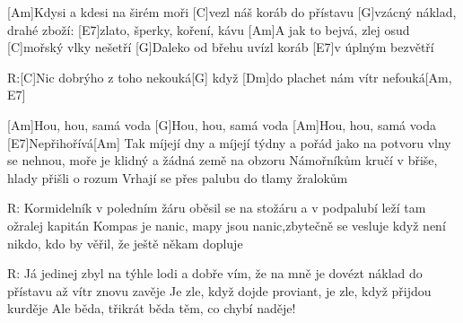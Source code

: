 
[Am]Kdysi a kdesi na širém moři [C]vezl náš koráb do přístavu 
[G]vzácný náklad, drahé zboží: [E7]zlato, šperky, koření, kávu 
[Am]A jak to bejvá, zlej osud [C]mořský vlky nešetří 
[G]Daleko od břehu uvízl koráb [E7]v úplným bezvětří 

R:[C]Nic dobrýho z toho nekouká[G] 
když [Dm]do plachet nám vítr nefouká[Am, E7] 

[Am]Hou, hou, samá voda 
[G]Hou, hou, samá voda 
[Am]Hou, hou, samá voda 
[E7]Nepřihořívá[Am] 
\slpc
Tak míjejí dny a míjejí týdny a pořád jako na potvoru 
vlny se nehnou, moře je klidný a žádná země na obzoru 
Námořníkům kručí v břiše, hlady přišli o rozum 
Vrhají se přes palubu do tlamy žralokům 

R:
Kormidelník v poledním žáru oběsil se na stožáru 
a v podpalubí leží tam ožralej kapitán 
Kompas je nanic, mapy jsou nanic,zbytečně se vesluje 
když není nikdo, kdo by věřil, že ještě někam dopluje 

R:
Já jedinej zbyl na týhle lodi a dobře vím, že na mně je 
dovézt náklad do přístavu až vítr znovu zavěje 
Je zle, když dojde proviant, je zle, když přijdou kurděje 
Ale běda, třikrát běda těm, co chybí naděje! 


